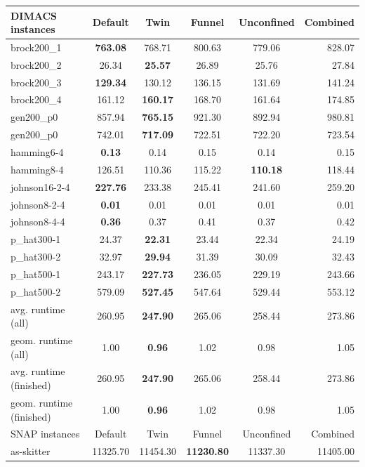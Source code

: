 \documentclass[a4paper,UKenglish,cleveref, autoref, thm-restate]{lipics-v2021}
\begin{document}
\begin{table}
	\begin{center}
		\begin{tabular}{|l| c| c| c| c| r|}
			\hline			
			DIMACS instances & Default & Twin & Funnel & Unconfined & Combined \\
			\hline
			brock200\_1 & \textbf{763.08} & 768.71 & 800.63 & 779.06 & 828.07 \\
			brock200\_2 & 26.34 & \textbf{25.57} & 26.89 & 25.76 & 27.84 \\
			brock200\_3 & \textbf{129.34} & 130.12 & 136.15 & 131.69 & 141.24 \\
			brock200\_4 & 161.12 & \textbf{160.17} & 168.70 & 161.64 & 174.85 \\
			gen200\_p0 & 857.94 & \textbf{765.15} & 921.30 & 892.94 & 980.81 \\
			gen200\_p0 & 742.01 & \textbf{717.09} & 722.51 & 722.20 & 723.54 \\
			hamming6-4 & \textbf{0.13} & 0.14 & 0.15 & 0.14 & 0.15 \\
			hamming8-4 & 126.51 & 110.36 & 115.22 & \textbf{110.18} & 118.44 \\
			johnson16-2-4 & \textbf{227.76} & 233.38 & 245.41 & 241.60 & 259.20 \\
			johnson8-2-4 & \textbf{0.01} & 0.01 & 0.01 & 0.01 & 0.01 \\
			johnson8-4-4 & \textbf{0.36} & 0.37 & 0.41 & 0.37 & 0.42 \\
			p\_hat300-1 & 24.37 & \textbf{22.31} & 23.44 & 22.34 & 24.19 \\
			p\_hat300-2 & 32.97 & \textbf{29.94} & 31.39 & 30.09 & 32.43 \\
			p\_hat500-1 & 243.17 & \textbf{227.73} & 236.05 & 229.19 & 243.66 \\
			p\_hat500-2 & 579.09 & \textbf{527.45} & 547.64 & 529.44 & 553.12 \\
			\hline
			avg. runtime (all) & 260.95 & \textbf{247.90} & 265.06 & 258.44 & 273.86 \\
			geom. runtime (all) & 1.00 & \textbf{0.96} & 1.02 & 0.98 & 1.05 \\
			avg. runtime (finished) & 260.95 & \textbf{247.90} & 265.06 & 258.44 & 273.86 \\
			geom. runtime (finished) & 1.00 & \textbf{0.96} & 1.02 & 0.98 & 1.05 \\
			\hline
			\hline
			SNAP instances & Default & Twin & Funnel & Unconfined & Combined \\
			as-skitter & 11325.70 & 11454.30 & \textbf{11230.80} & 11337.30 & 11405.00 \\

\end{tabular}
\end{center}
\end{table}
\end{document}
